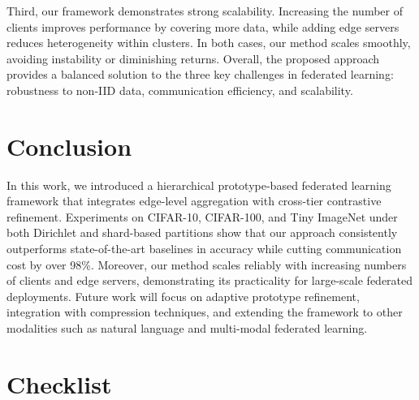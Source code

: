 \documentclass[twoside]{article}
\begin{document}
Third, our framework demonstrates strong scalability. Increasing the number of clients improves performance by covering more data, while adding edge servers reduces heterogeneity within clusters. In both cases, our method scales smoothly, avoiding instability or diminishing returns. Overall, the proposed approach provides a balanced solution to the three key challenges in federated learning: robustness to non-IID data, communication efficiency, and scalability.  

\section{Conclusion}

In this work, we introduced a hierarchical prototype-based federated learning framework that integrates edge-level aggregation with cross-tier contrastive refinement. Experiments on CIFAR-10, CIFAR-100, and Tiny ImageNet under both Dirichlet and shard-based partitions show that our approach consistently outperforms state-of-the-art baselines in accuracy while cutting communication cost by over 98\%. Moreover, our method scales reliably with increasing numbers of clients and edge servers, demonstrating its practicality for large-scale federated deployments. Future work will focus on adaptive prototype refinement, integration with compression techniques, and extending the framework to other modalities such as natural language and multi-modal federated learning.  



\section*{Checklist}



\end{document}
